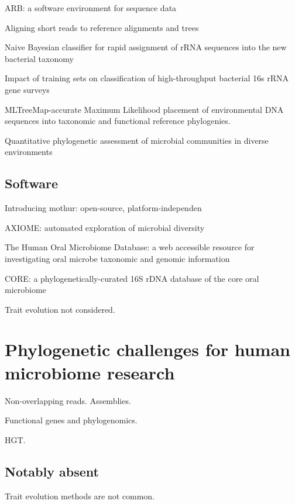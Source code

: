 \documentclass{amsart}
\begin{document}
\cite{matsen2010pplacer}

\cite{ludwig2004arb}
{{ARB}: a software environment for sequence data}
\cite{berger2011performance}

\cite{berger2011aligning}
Aligning short reads to reference alignments and trees


\cite{wang2007naive}
{Naive Bayesian classifier for rapid assignment of rRNA sequences into the new bacterial taxonomy}

\cite{werner2011impact}
Impact of training sets on classification of high-throughput bacterial 16s rRNA gene surveys


\cite{stark2010mltreemap}
{{MLTreeMap}-accurate Maximum Likelihood placement of environmental DNA sequences into taxonomic and functional reference phylogenies.}

\cite{vonMeringEaQuantitative08}
{Quantitative phylogenetic assessment of microbial communities in diverse environments}

\subsection{Software}
\cite{caporaso2010qiime}

\cite{schloss2009introducing}
Introducing mothur: open-source, platform-independen

\cite{lynch2013axiome}
AXIOME: automated exploration of microbial diversity

\cite{chen2010human}
The Human Oral Microbiome Database: a web accessible resource for investigating oral microbe taxonomic and genomic information

\cite{griffen2011core}
CORE: a phylogenetically-curated 16S rDNA database of the core oral microbiome

\cite{srinivasan2012bacterial}

Trait evolution not considered.


\section{Phylogenetic challenges for human microbiome research}

Non-overlapping reads.
Assemblies.

Functional genes and phylogenomics.

HGT.

\subsection{Notably absent}
Trait evolution methods are not common.
\end{document}
